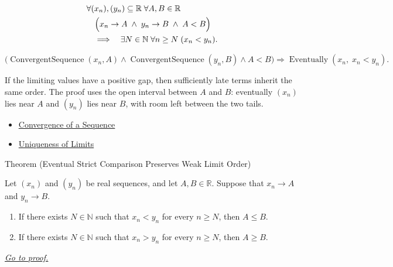\begin{remark*}
\[
\begin{aligned}
&\forall (x_n),(y_n)\subseteq\mathbb{R}\;\forall A,B\in\mathbb{R}\\
&\quad\Bigl(
  x_n\to A
  \;\land\;
  y_n\to B
  \;\land\;
  A<B
\Bigr)\\
&\quad\Longrightarrow\quad
\exists N\in\mathbb{N}\;\forall n\ge N\;(x_n<y_n).
\end{aligned}
\]
\end{remark*}

\begin{remark*}
\[
\bigl(
\operatorname{ConvergentSequence}(x_n,A)
\land
\operatorname{ConvergentSequence}(y_n,B)
\land
A<B
\bigr)
\Longrightarrow
\operatorname{Eventually}(x_n,\;x_n<y_n).
\]
\end{remark*}

\begin{remark*}[Interpretation]
If the limiting values have a positive gap, then sufficiently late terms
inherit the same order. The proof uses the open interval between $A$ and $B$:
eventually $(x_n)$ lies near $A$ and $(y_n)$ lies near $B$, with room left
between the two tails.
\end{remark*}

\begin{remark*}[Dependencies]
\begin{itemize}
  \item \hyperref[def:convergent-sequence]{Convergence of a Sequence}
  \item \hyperref[thm:uniqueness-of-limits]{Uniqueness of Limits}
\end{itemize}
\end{remark*}


\begin{theorembox}{Theorem (Eventual Strict Comparison Preserves Weak Limit Order)}
\begin{theorem}
\label{thm:eventual-strict-comparison-preserves-weak-limit-order}

Let $(x_n)$ and $(y_n)$ be real sequences, and let $A,B\in\mathbb{R}$.
Suppose that $x_n\to A$ and $y_n\to B$.
\begin{enumerate}[label=(\alph*)]
  \item If there exists $N\in\mathbb{N}$ such that $x_n<y_n$ for every
  $n\ge N$, then $A\le B$.
  \item If there exists $N\in\mathbb{N}$ such that $x_n>y_n$ for every
  $n\ge N$, then $A\ge B$.
\end{enumerate}

\smallskip
\noindent
\hyperref[prf:eventual-strict-comparison-preserves-weak-limit-order]{\textit{Go to proof.}}
\end{theorem}
\end{theorembox}

